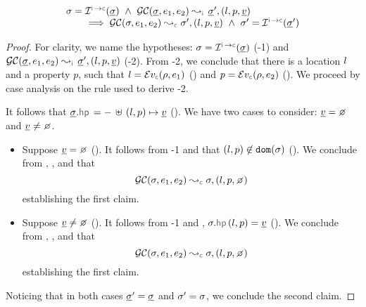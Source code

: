 \begin{lemma}\label{erasure:getcell}
$$
\begin{array}{l}
\jstate = \interpret{\instconc}{}(\istate)  \ \wedge \ 
\absgetcellrule{\instrumented}{\istate, \jsilexpr_1, \jsilexpr_2}{\istate', (\loc, p, \ival)} \\ \quad \quad
  \implies \absgetcellrule{\concrete}{\jstate, \jsilexpr_1, \jsilexpr_2}{\jstate', (\loc, p, \ival)} 
     \ \wedge \ \jstate' = \interpret{\instconc}{}(\istate')
\end{array}
$$
\end{lemma}
\begin{proof}
For clarity, we name the hypotheses: $\jstate = \interpret{\instconc}{}(\istate)$ (\hyp{1})
and $\absgetcellrule{\instrumented}{\istate, \jsilexpr_1, \jsilexpr_2}{\istate', (\loc, p, \ival)}$ (\hyp{2}).
From \hyp{2}, we conclude that there is a location $l$ and a property $p$, such 
that $\loc = \evalexpr{\concrete}(\store, \jsilexpr_1)$ (\ieq{1}) and 
$p = \evalexpr{\concrete}(\store, \jsilexpr_2)$ (\ieq{2}). 
We  proceed by case analysis on the rule used to derive \hyp{2}. 
 \vspace{3pt} 
 
  \noindent {} 
   It follows that $\istate.\hpsel = - \, \uplus \, (\loc, p) \mapsto \ival$ (). 
   We have two cases to consider: $\ival = \none$ and $\ival \neq \none$. 
   \begin{itemize}
        \item Suppose $\ival = \none$ (). It follows from \hyp{1} and  
                 that $(l, p) \not\in \texttt{dom}(\sigma)$ (). 
                 We conclude from \ieq{1}, \ieq{2}, and \ieq{4} that 
                 $$
                   \absgetcellrule{\concrete}{\jstate, \jsilexpr_1, \jsilexpr_2}{\jstate, (\loc, p, \none)}
                 $$ establishing the first claim. 
        \item Suppose $\ival \neq \none$ (). It follows from \hyp{1} and , 
                 $\jstate.\hpsel(\loc, p) = \ival$ (\ieq{6}). 
                  We conclude from , , and  that 
                   $$
                   \absgetcellrule{\concrete}{\jstate, \jsilexpr_1, \jsilexpr_2}{\jstate, (\loc, p, \none)}
                 $$ establishing the first claim.                  
   \end{itemize}
   Noticing that in both cases $\underline{\sigma}' = \underline{\sigma}$ and $\sigma' = \sigma$, we conclude the
   second claim. 
   \vspace{3pt}
   

\end{proof}
